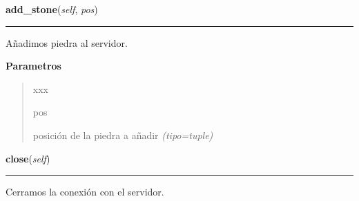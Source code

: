     \label{src:igs:Igs:add_stone}

    \vspace{0.5ex}

\hspace{.8\funcindent}\begin{boxedminipage}{\funcwidth}

    \raggedright \textbf{add\_stone}(\textit{self}, \textit{pos})

    \vspace{-1.5ex}

    \rule{\textwidth}{0.5\fboxrule}
\setlength{\parskip}{2ex}
Añadimos piedra al servidor.

\setlength{\parskip}{1ex}
      \textbf{Parametros}
      \vspace{-1ex}

      \begin{quote}
        \begin{Ventry}{xxx}

          \item[pos]


posición de la piedra a añadir
            {\it (tipo=tuple)}

        \end{Ventry}

      \end{quote}

    \end{boxedminipage}

    \label{src:igs:Igs:close}

    \vspace{0.5ex}

\hspace{.8\funcindent}\begin{boxedminipage}{\funcwidth}

    \raggedright \textbf{close}(\textit{self})

    \vspace{-1.5ex}

    \rule{\textwidth}{0.5\fboxrule}
\setlength{\parskip}{2ex}

Cerramos la conexión con el servidor.
\setlength{\parskip}{1ex}
    \end{boxedminipage}

